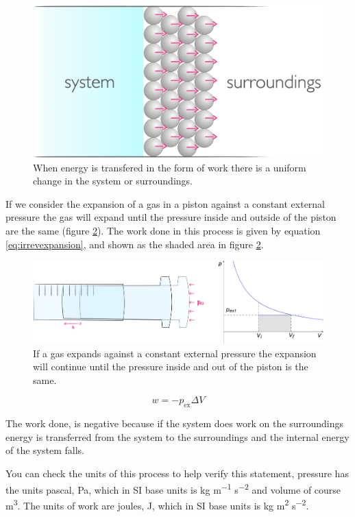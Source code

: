 \documentclass[
]{book}
\begin{document}
\begin{figure}

{\centering \includegraphics[width=0.5\linewidth]{images/work} 

}

\caption{When energy is transfered in the form of work there is a uniform change in the system or surroundings.}\label{fig:work}
\end{figure}

If we consider the expansion of a gas in a piston against a constant external pressure the gas will expand until the pressure inside and outside of the piston are the same (figure \ref{fig:irrevexpansion}). The work done in this process is given by equation \eqref{eq:irrevexpansion}, and shown as the shaded area in figure \ref{fig:irrevexpansion}.

\begin{figure}

{\centering \includegraphics[width=1\linewidth]{images/irrevexpansion} 

}

\caption{If a gas expands against a constant external pressure the expansion will continue until the pressure inside and out of the piston is the same.}\label{fig:irrevexpansion}
\end{figure}

\begin{equation}
w=-p_{\textrm{ex}}\Delta V
\label{eq:irrevexpansion}
\end{equation}

The work done, is negative because if the system does work on the surroundings energy is transferred from the system to the surroundings and the internal energy of the system falls.

You can check the units of this process to help verify this statement, pressure has the units pascal, Pa, which in SI base units is kg m\textsuperscript{−1} s\textsuperscript{−2} and volume of course m\textsuperscript{3}. The units of work are joules, J, which in SI base units is kg m\textsuperscript{2} s\textsuperscript{−2}.
\end{document}
